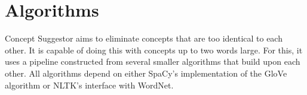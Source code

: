 \documentclass{article}
\begin{document}




\section{Algorithms} \label{sec:algorithms}

Concept Suggestor aims to eliminate concepts that are too identical to each other. It is capable of doing this with concepts up to two words large. For this, it uses a pipeline constructed from several smaller algorithms that build upon each other. All algorithms depend on either SpaCy's implementation of the GloVe algorithm or NLTK's interface with WordNet.
\end{document}
